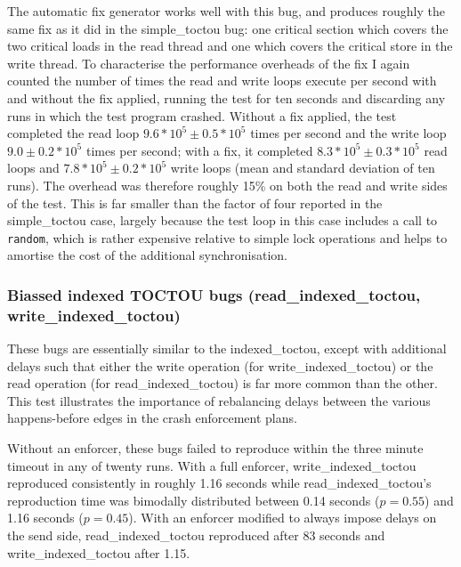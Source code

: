 The automatic fix generator works well with this bug, and produces
roughly the same fix as it did in the simple\_toctou bug: one critical
section which covers the two critical loads in the read thread and one
which covers the critical store in the write thread.  To characterise
the performance overheads of the fix I again counted the number of
times the read and write loops execute per second with and without the
fix applied, running the test for ten seconds and discarding any runs
in which the test program crashed.  Without a fix applied, the test
completed the read loop $9.6 * 10^5 \pm 0.5 * 10^5$ times per second
and the write loop $9.0 \pm 0.2 * 10^5$ times per second; with a fix,
it completed $8.3 * 10^5 \pm 0.3 * 10^5$ read loops and $7.8 * 10^5
\pm 0.2 * 10^5$ write loops (mean and standard deviation of ten runs).
The overhead was therefore roughly 15\% on both the read and write
sides of the test.  This is far smaller than the factor of four reported in the
simple\_toctou case, largely because the test loop in this case
includes a call to \verb|random|, which is rather expensive relative
to simple lock operations and helps to amortise the cost of the
additional synchronisation.


\subsubsection{Biassed indexed TOCTOU bugs (read\_indexed\_toctou, write\_indexed\_toctou)}

These bugs are essentially similar to the indexed\_toctou, except with
additional delays such that either the write operation (for
write\_indexed\_toctou) or the read operation (for
read\_indexed\_toctou) is far more common than the other.  This test
illustrates the importance of rebalancing delays between the various
happens-before edges in the crash enforcement plans.

Without an enforcer, these bugs failed to reproduce within the three
minute timeout in any of twenty runs.  With a full enforcer,
write\_indexed\_toctou reproduced consistently in roughly 1.16 seconds
while read\_indexed\_toctou's reproduction time was bimodally
distributed between 0.14 seconds ($p = 0.55$) and 1.16 seconds ($p =
0.45$).  With an enforcer modified to always impose delays on the send
side, read\_indexed\_toctou reproduced after 83 seconds and
write\_indexed\_toctou after 1.15.

